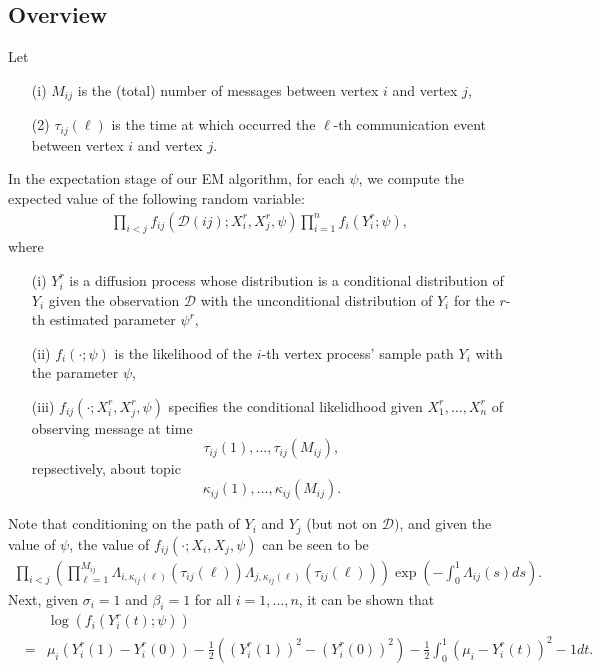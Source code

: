 \documentclass[12pt]{article}%
\begin{document}
\subsection{Overview}
Let
\begin{enumerate}
\item[(i)] $M_{ij}$ is the (total) number of messages between vertex $i$ and vertex $j$,
\item[(2)] $\tau_{ij}(\ell)$ is the time at which occurred the $\ell$-th communication event  between vertex $i$ and vertex $j$.
\end{enumerate}
In the expectation stage of our EM algorithm, for each $\psi$, we compute the expected value of the following random variable:
\begin{eqnarray}
\prod_{i<j} f_{ij}(\mathcal D(ij);X_i^r,X_j^r,\psi) \prod_{i=1}^n f_{i}(Y_i^r;\psi),
\end{eqnarray}
where 
\begin{enumerate}
\item[(i)] $Y_i^r$ is a diffusion process whose distribution is a conditional distribution of $Y_i$ given the observation $\mathcal D$ with the unconditional distribution of $Y_i$ for the $r$-th estimated parameter $\psi^r$,
\item[(ii)] $f_{i}(\cdot;\psi)$ is the likelihood of the $i$-th vertex 
process' sample path $Y_i$ with the parameter $\psi$,
\item[(iii)] $f_{ij}(\cdot;X_i^r,X_j^r,\psi)$ specifies the conditional likelidhood given $X_1^r,\ldots,X_n^r$ of 
observing message at time 
$$
\tau_{ij}(1),\ldots, \tau_{ij}(M_{ij}),
$$
repsectively, about topic 
$$
\kappa_{ij}(1),\ldots, \kappa_{ij}(M_{ij}).
$$
\end{enumerate}

   
Note that conditioning on the path of $Y_i$ and $Y_j$ (but not on $\mathcal D)$, and given the value of $\psi$, the value of $f_{ij}(\cdot;X_i,X_j,\psi)$ can be seen to be
\begin{eqnarray}\label{formula2010.12.19.12.31.pm}
\prod_{i<j} \left(\prod_{\ell=1}^{M_{ij}} \Lambda_{i,\kappa_{ij}(\ell)}(\tau_{ij}(\ell))\Lambda_{j,\kappa_{ij}(\ell)}(\tau_{ij}(\ell))\right) \exp\left(-\int_0^1 \Lambda_{ij}(s) ds\right).
\end{eqnarray}
Next, given $\sigma_i=1$ and $\beta_i=1$ for all $i=1,\ldots, n$, 
it can be shown that
\begin{eqnarray*}
&\ &\log (f_i(Y_{i}^r(t);\psi))\\
&= & \mu_i (Y_{i}^r(1) - Y_{i}^r(0)) - \frac{1}{2} ((Y_{i}^r(1))^2 - (Y_i^r(0))^2) - \frac{1}{2} \int_0^1 (\mu_i-Y_{i}^r(t))^2 - 1 dt. 
\end{eqnarray*}
\end{document}

